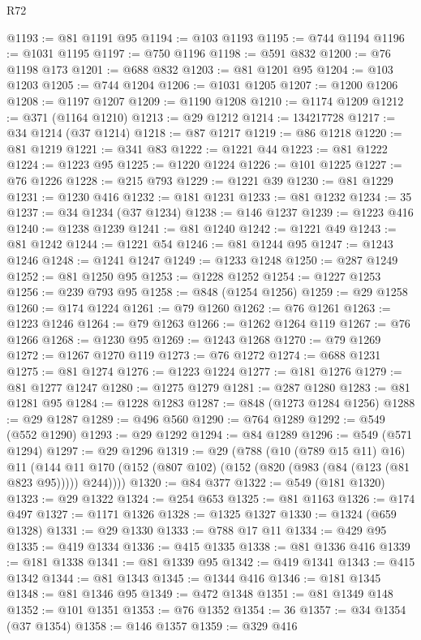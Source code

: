 \begin{lexlean}{R72}
\begin{coremodule}
@1193 := @81 @1191 @95
@1194 := @103 @1193
@1195 := @744 @1194
@1196 := @1031 @1195
@1197 := @750 @1196
@1198 := @591 @832
@1200 := @76 @1198 @173
@1201 := @688 @832
@1203 := @81 @1201 @95
@1204 := @103 @1203
@1205 := @744 @1204
@1206 := @1031 @1205
@1207 := @1200 @1206
@1208 := @1197 @1207
@1209 := @1190 @1208
@1210 := @1174 @1209
@1212 := @371 (@1164 @1210)
@1213 := @29 @1212
@1214 := 134217728
@1217 := @34 @1214 (@37 @1214)
@1218 := @87 @1217
@1219 := @86 @1218
@1220 := @81 @1219
@1221 := @341 @83
@1222 := @1221 @44
@1223 := @81 @1222
@1224 := @1223 @95
@1225 := @1220 @1224
@1226 := @101 @1225
@1227 := @76 @1226
@1228 := @215 @793
@1229 := @1221 @39
@1230 := @81 @1229
@1231 := @1230 @416
@1232 := @181 @1231
@1233 := @81 @1232
@1234 := 35
@1237 := @34 @1234 (@37 @1234)
@1238 := @146 @1237
@1239 := @1223 @416
@1240 := @1238 @1239
@1241 := @81 @1240
@1242 := @1221 @49
@1243 := @81 @1242
@1244 := @1221 @54
@1246 := @81 @1244 @95
@1247 := @1243 @1246
@1248 := @1241 @1247
@1249 := @1233 @1248
@1250 := @287 @1249
@1252 := @81 @1250 @95
@1253 := @1228 @1252
@1254 := @1227 @1253
@1256 := @239 @793 @95
@1258 := @848 (@1254 @1256)
@1259 := @29 @1258
@1260 := @174 @1224
@1261 := @79 @1260
@1262 := @76 @1261
@1263 := @1223 @1246
@1264 := @79 @1263
@1266 := @1262 @1264 @119
@1267 := @76 @1266
@1268 := @1230 @95
@1269 := @1243 @1268
@1270 := @79 @1269
@1272 := @1267 @1270 @119
@1273 := @76 @1272
@1274 := @688 @1231
@1275 := @81 @1274
@1276 := @1223 @1224
@1277 := @181 @1276
@1279 := @81 @1277 @1247
@1280 := @1275 @1279
@1281 := @287 @1280
@1283 := @81 @1281 @95
@1284 := @1228 @1283
@1287 := @848 (@1273 @1284 @1256)
@1288 := @29 @1287
@1289 := @496 @560
@1290 := @764 @1289
@1292 := @549 (@552 @1290)
@1293 := @29 @1292
@1294 := @84 @1289
@1296 := @549 (@571 @1294)
@1297 := @29 @1296
@1319 := @29
    (@788
      (@10 (@789 @15 @11) @16)
      @11
      (@144 @11 @170 (@152 (@807 @102) (@152 (@820 (@983 (@84 (@123 (@81 @823 @95))))) @244))))
@1320 := @84 @377
@1322 := @549 (@181 @1320)
@1323 := @29 @1322
@1324 := @254 @653
@1325 := @81 @1163
@1326 := @174 @497
@1327 := @1171 @1326
@1328 := @1325 @1327
@1330 := @1324 (@659 @1328)
@1331 := @29 @1330
@1333 := @788 @17 @11
@1334 := @429 @95
@1335 := @419 @1334
@1336 := @415 @1335
@1338 := @81 @1336 @416
@1339 := @181 @1338
@1341 := @81 @1339 @95
@1342 := @419 @1341
@1343 := @415 @1342
@1344 := @81 @1343
@1345 := @1344 @416
@1346 := @181 @1345
@1348 := @81 @1346 @95
@1349 := @472 @1348
@1351 := @81 @1349 @148
@1352 := @101 @1351
@1353 := @76 @1352
@1354 := 36
@1357 := @34 @1354 (@37 @1354)
@1358 := @146 @1357
@1359 := @329 @416

\end{coremodule}
\end{lexlean}
